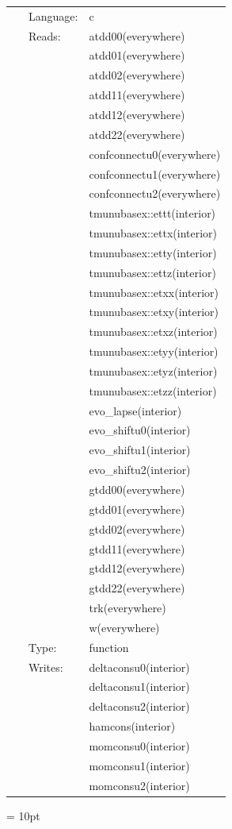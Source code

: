 \documentclass{article}
\begin{document}
 \begin{tabular*}{160mm}{cll} 
~ & Language:  & c \\ 
~ & Reads:  & atdd00(everywhere) \\ 
~& ~ &atdd01(everywhere)\\ 
~& ~ &atdd02(everywhere)\\ 
~& ~ &atdd11(everywhere)\\ 
~& ~ &atdd12(everywhere)\\ 
~& ~ &atdd22(everywhere)\\ 
~& ~ &confconnectu0(everywhere)\\ 
~& ~ &confconnectu1(everywhere)\\ 
~& ~ &confconnectu2(everywhere)\\ 
~& ~ &tmunubasex::ettt(interior)\\ 
~& ~ &tmunubasex::ettx(interior)\\ 
~& ~ &tmunubasex::etty(interior)\\ 
~& ~ &tmunubasex::ettz(interior)\\ 
~& ~ &tmunubasex::etxx(interior)\\ 
~& ~ &tmunubasex::etxy(interior)\\ 
~& ~ &tmunubasex::etxz(interior)\\ 
~& ~ &tmunubasex::etyy(interior)\\ 
~& ~ &tmunubasex::etyz(interior)\\ 
~& ~ &tmunubasex::etzz(interior)\\ 
~& ~ &evo\_lapse(interior)\\ 
~& ~ &evo\_shiftu0(interior)\\ 
~& ~ &evo\_shiftu1(interior)\\ 
~& ~ &evo\_shiftu2(interior)\\ 
~& ~ &gtdd00(everywhere)\\ 
~& ~ &gtdd01(everywhere)\\ 
~& ~ &gtdd02(everywhere)\\ 
~& ~ &gtdd11(everywhere)\\ 
~& ~ &gtdd12(everywhere)\\ 
~& ~ &gtdd22(everywhere)\\ 
~& ~ &trk(everywhere)\\ 
~& ~ &w(everywhere)\\ 
~ & Type:  & function \\ 
~ & Writes:  & deltaconsu0(interior) \\ 
~& ~ &deltaconsu1(interior)\\ 
~& ~ &deltaconsu2(interior)\\ 
~& ~ &hamcons(interior)\\ 
~& ~ &momconsu0(interior)\\ 
~& ~ &momconsu1(interior)\\ 
~& ~ &momconsu2(interior)\\ 
\end{tabular*} 



\vspace{5mm}\parskip = 10pt 
\end{document}
